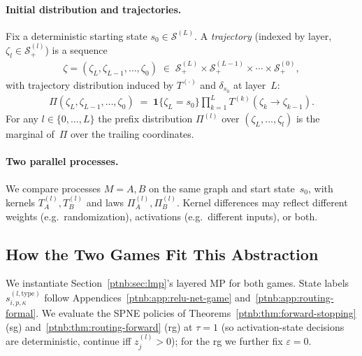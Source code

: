 \paragraph{Initial distribution and trajectories.}
Fix a deterministic starting state $s_0 \in \mathcal{S}^{(L)}$.  A \emph{trajectory} (indexed by
layer, $\zeta_l \in \mathcal{S}^{(l)}_+$) is a sequence
\begin{align}
    \zeta = (\zeta_L, \zeta_{L-1}, \ldots, \zeta_0) \;\in\; \mathcal{S}^{(L)}_+ \times
    \mathcal{S}^{(L-1)}_+ \times \cdots \times \mathcal{S}^{(0)}_+,
\end{align}
with trajectory distribution induced by $T^{(\cdot)}$ and $\delta_{s_0}$ at layer~$L$:
\begin{align}\label{ptnb:eq:path-measure}
    \Pi(\zeta_L, \zeta_{L-1}, \ldots, \zeta_0) \;=\; \mathbf{1}\{\zeta_L = s_0\} \prod_{k=1}^{L}
    T^{(k)}(\zeta_k \to \zeta_{k-1}).
\end{align}
For any $l \in \{0,\ldots,L\}$ the prefix distribution $\Pi^{(l)}$ over $(\zeta_L, \ldots,
    \zeta_l)$ is the marginal of~$\Pi$ over the trailing coordinates.

\paragraph{Two parallel processes.}
We compare processes $M=A,B$ on the same graph and start state~$s_0$, with kernels
$T^{(l)}_A,T^{(l)}_B$ and laws $\Pi_A^{(l)},\Pi_B^{(l)}$.
Kernel differences may reflect different weights (e.g.\ randomization), activations
(e.g.\ different inputs), or both.

\subsection{How the Two Games Fit This Abstraction}\label{ptnb:sec:games-fit}

We instantiate Section~\ref{ptnb:sec:lmp}'s layered MP for both games. State
labels $s^{(l,\mathrm{type})}_{i,p,\kappa}$ follow Appendices~\ref{ptnb:app:relu-net-game}
and~\ref{ptnb:app:routing-formal}. We evaluate the SPNE policies of Theorems~\ref{ptnb:thm:forward-stopping}
(\ac{sg}) and~\ref{ptnb:thm:routing-forward} (\ac{rg}) at $\tau = 1$ (so activation-state decisions are
deterministic, continue iff $z_j^{(l)} > 0$); for the \ac{rg} we further fix $\varepsilon = 0$.

